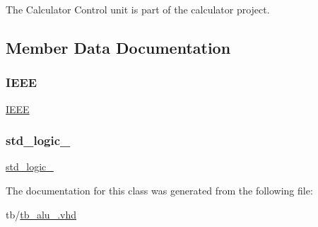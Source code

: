 The Calculator Control unit is part of the calculator project. 

\subsection{Member Data Documentation}
\mbox{\label{classtb__alu_ae4f03c286607f3181e16b9aa12d0c6d4}} 
\subsubsection{\texorpdfstring{I\+E\+EE}{IEEE}}
{\footnotesize\ttfamily \hyperlink{classtb__alu_ae4f03c286607f3181e16b9aa12d0c6d4}{I\+E\+EE}\hspace{0.3cm}{\ttfamily [Library]}}

\mbox{\label{classtb__alu_acd03516902501cd1c7296a98e22c6fcb}} 
\subsubsection{\texorpdfstring{std\+\_\+logic\+\_}{std\_logic\_1164}}
{\footnotesize\ttfamily \hyperlink{classtb__alu_acd03516902501cd1c7296a98e22c6fcb}{std\+\_\+logic\+\_}\hspace{0.3cm}{\ttfamily [Package]}}



The documentation for this class was generated from the following file\+:\begin{DoxyCompactItemize}
\item 
tb/\hyperlink{tb__alu___8vhd}{tb\+\_\+alu\+\_\+.\+vhd}\end{DoxyCompactItemize}
